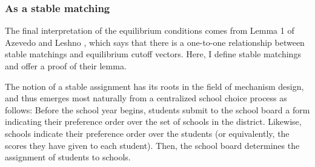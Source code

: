 \documentclass[12pt]{article}
\numberwithin{equation}{subsection}
\theoremstyle{definition}
\begin{document}
%
%
%

\subsubsection{As a stable matching}
The final interpretation of the equilibrium conditions comes from Lemma 1 of Azevedo and Leshno \parencite*{supplydemandfw}, which says that there is a one-to-one relationship between stable matchings and equilibrium cutoff vectors. Here, I define stable matchings and offer a proof of their lemma. 

The notion of a stable assignment has its roots in the field of mechanism design, and thus emerges most naturally from a centralized school choice process as follows: Before the school year begins, students submit to the school board a form indicating their preference order over the set of schools in the district. Likewise, schools indicate their preference order over the students (or equivalently, the scores they have given to each student). Then, the school board determines the assignment of students to schools.
\end{document}
